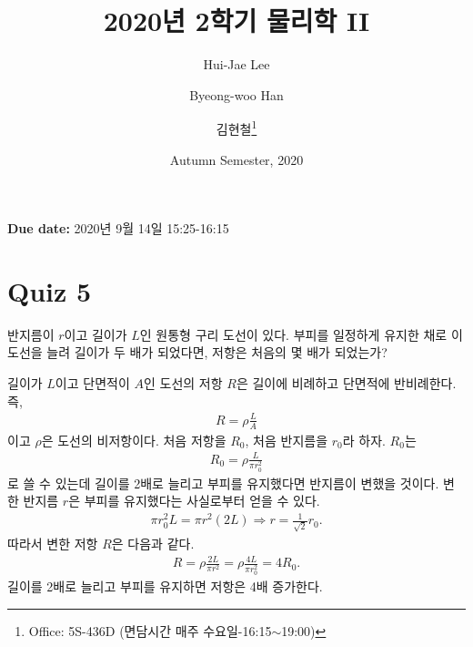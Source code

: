 \documentclass[tightenlines,floatfix,nofootinbib,superscriptaddress,fleqn]{revtex4}
\begin{document}
\title{\Large 2020년 2학기 물리학 II}

\author{Hui-Jae Lee} 
\author{Byeong-woo Han} 
  \author{김현철\footnote{Office: 5S-436D (면담시간 매주
  수요일-16:15$\sim$19:00)}} 
\date{Autumn Semester, 2020}


\maketitle

{\color{red} {\bf Due date:} 2020년 9월 14일  15:25-16:15 }
\vspace{1.cm}

\section*{\large Quiz 5}
 반지름이 $r$이고 길이가 $L$인 원통형
구리 도선이 있다. 부피를 일정하게 유지한 채로 이 도선을 늘려 길이가 두
배가 되었다면, 저항은 처음의 몇 배가 되었는가? 
\vspace{0.5cm}

길이가 $L$이고 단면적이 $A$인 도선의 저항 $R$은 길이에 비례하고 단면적에 반비례한다. 즉,
\begin{align}
  R=\rho\frac{L}{A}
\end{align}
이고 $\rho$은 도선의 비저항이다. 처음 저항을 $R_0$, 처음 반지름을 $r_0$라 하자. 
$R_0$는
\begin{align}
  R_0 = \rho\frac{L}{\pi r^2_0}
\end{align}
로 쓸 수 있는데 길이를 2배로 늘리고 부피를 유지했다면 반지름이 변했을 것이다. 변한 반지름 $r$은
부피를 유지했다는 사실로부터 얻을 수 있다.
\begin{align}
  \pi r^2_0 L = \pi r^2(2L)\Longrightarrow r = \frac{1}{\sqrt{2}}r_0.
\end{align}
따라서 변한 저항 $R$은 다음과 같다.
\begin{align}
  R = \rho\frac{2L}{\pi r^2}=\rho\frac{4L}{\pi r_0^2}=4R_0.
\end{align}
길이를 2배로 늘리고 부피를 유지하면 저항은 4배 증가한다.
\vspace{0.5cm}
\end{document}
